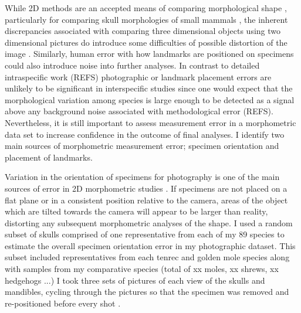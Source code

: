	While 2D methods are an accepted means of comparing morphological shape \citep[e.g.][]{Adams2004, Mitteroecker2009}, particularly for comparing skull morphologies of small mammals \citep[e.g.][]{Cardini2003, Panchetti2008, White2008, Barrow2008, Scalici2011}, the inherent discrepancies associated with comparing three dimensional objects using two dimensional pictures do introduce some difficulties of possible distortion of the image \citep{Arnqvist1998}. Similarly, human error with how landmarks are positioned on specimens could also introduce noise into further analyses. 
	In contrast to detailed intraspecific work (REFS) photographic or landmark placement errors are unlikely to be significant in interspecific studies since one would expect that the morphological variation among species is large enough to  be detected as a signal above any background noise associated with methodological error (REFS). Nevertheless, it is still important to assess measurement error in a morphometric data set to increase confidence in the outcome of final analyses.
	I identify two main sources of morphometric measurement error; specimen orientation and placement of landmarks.


	Variation in the orientation of specimens for photography is one of the main sources of error in 2D morphometric studies \citep{Adriaens2007}. If specimens are not placed on a flat plane or in a consistent position relative to the camera, areas of the object which are tilted towards the camera will appear to be larger than reality, distorting any subsequent morphometric analyses of the shape. 
	I used a random subset of skulls comprised of one representative from each of my 89 species %
	to estimate the overall specimen orientation error in my photographic dataset. This subset included representatives from each tenrec and golden mole species along with samples from my comparative species (total of xx moles, xx shrews, xx hedgehogs ...)  I took three sets of pictures of each view of the skulls and mandibles, cycling through the pictures so that the specimen was removed and re-positioned before every shot \citep{Viscosi2011}. 


